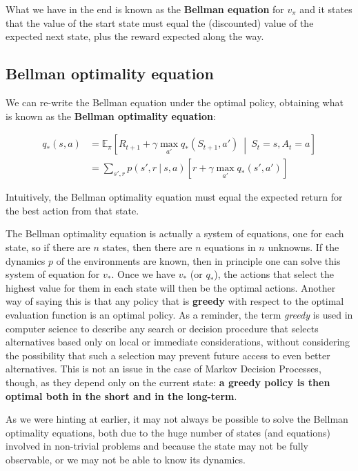 What we have in the end is known as the \textbf{Bellman equation} for $v_\pi$ and it states that the value of the start state must equal the (discounted) value of the expected next state, plus the reward expected along the way.

\subsection{Bellman optimality equation}
We can re-write the Bellman equation under the optimal policy, obtaining what is known as the \textbf{Bellman optimality equation}:

\begin{equation}
    \begin{split}
        q_*(s,a) & = \mathbb{E}_{\pi} \left[ R_{t+1} + \gamma \max_{a'} q_* (S_{t+1}, a') \ \middle\vert \ S_t = s, A_t = a \right] \\
        & = \sum_{s', r} p(s',r \ \vert \ s,a) \left[ r + \gamma \max_{a'} q_*(s',a') \right]
    \end{split}
    \label{eq:ch2-bellmanoptimalityequation}
\end{equation}

Intuitively, the Bellman optimality equation must equal the expected return for the best action from that state. 

The Bellman optimality equation is actually a system of equations, one for each state, so if there are $n$ states, then there are $n$ equations in $n$ unknowns. If the dynamics $p$ of the environments are known, then in principle one can solve this system of equation for $v_*$. Once we have $v_*$ (or $q_*$), the actions that select the highest value for them in each state will then be the optimal actions. Another way of saying this is that any policy that is \textbf{greedy} with respect to the optimal evaluation function is an optimal policy. As a reminder, the term \textit{greedy} is used in computer science to describe any search or decision procedure that selects alternatives based only on local or immediate considerations, without considering the possibility that such a selection may prevent future access to even better alternatives. This is not an issue in the case of Markov Decision Processes, though, as they depend only on the current state: \textbf{a greedy policy is then optimal both in the short and in the long-term}.

As we were hinting at earlier, it may not always be possible to solve the Bellman optimality equations, both due to the huge number of states (and equations) involved in non-trivial problems and because the state may not be fully observable, or we may not be able to know its dynamics.